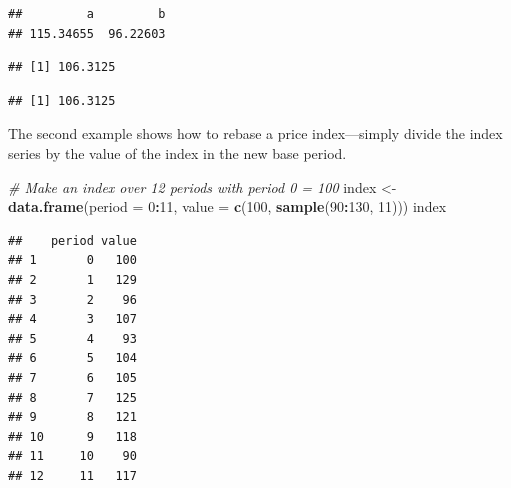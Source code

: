 \documentclass[]{article}
\newenvironment{Shaded}{\begin{snugshade}}{\end{snugshade}}
\newcommand{\CommentTok}[1]{\textcolor[rgb]{0.56,0.35,0.01}{\textit{#1}}}
\newcommand{\DataTypeTok}[1]{\textcolor[rgb]{0.13,0.29,0.53}{#1}}
\newcommand{\DecValTok}[1]{\textcolor[rgb]{0.00,0.00,0.81}{#1}}
\newcommand{\KeywordTok}[1]{\textcolor[rgb]{0.13,0.29,0.53}{\textbf{#1}}}
\newcommand{\NormalTok}[1]{#1}
\newcommand{\OperatorTok}[1]{\textcolor[rgb]{0.81,0.36,0.00}{\textbf{#1}}}
\newcommand{\StringTok}[1]{\textcolor[rgb]{0.31,0.60,0.02}{#1}}
\begin{document}
\begin{verbatim}
##         a         b 
## 115.34655  96.22603
\end{verbatim}

\begin{Shaded}
\end{Shaded}

\begin{verbatim}
## [1] 106.3125
\end{verbatim}

\begin{Shaded}
\end{Shaded}

\begin{verbatim}
## [1] 106.3125
\end{verbatim}

The second example shows how to rebase a price index---simply divide the index series by the value of the index in the new base period.

\begin{Shaded}
\begin{Highlighting}[]
\CommentTok{# Make an index over 12 periods with period 0 = 100}
\NormalTok{index <-}\StringTok{ }\KeywordTok{data.frame}\NormalTok{(}\DataTypeTok{period =} \DecValTok{0}\OperatorTok{:}\DecValTok{11}\NormalTok{, }\DataTypeTok{value =} \KeywordTok{c}\NormalTok{(}\DecValTok{100}\NormalTok{, }\KeywordTok{sample}\NormalTok{(}\DecValTok{90}\OperatorTok{:}\DecValTok{130}\NormalTok{, }\DecValTok{11}\NormalTok{)))}
\NormalTok{index}
\end{Highlighting}
\end{Shaded}

\begin{verbatim}
##    period value
## 1       0   100
## 2       1   129
## 3       2    96
## 4       3   107
## 5       4    93
## 6       5   104
## 7       6   105
## 8       7   125
## 9       8   121
## 10      9   118
## 11     10    90
## 12     11   117
\end{verbatim}
\end{document}
